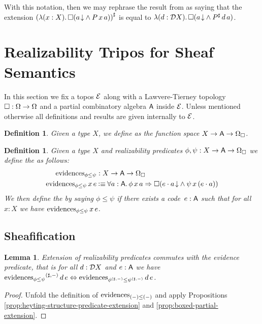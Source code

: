 \documentclass[11pt]{article}
\newtheorem{lemm}[thrm]{Lemma}
\newtheorem{defn}[thrm]{Definition}
\begin{document}
With this notation, then we may rephrase the result from
 as saying that the extension
%
\(
  {({\mathop{\lambda({x:X}).}{\Box{({{{a}\!\downarrow}}\land{P\,x\,a})}}})}^\sharp
\)
%
is equal to
%
\(
  {\mathop{\lambda({d:\mathcal{D}{X}}).}{\Box{({{{a}\!\downarrow}}\land{{P}^\sharp\,d\,a})}}}
\).


\newpage

\section{Realizability Tripos for Sheaf Semantics}

In this section we fix a topos \(\mathcal{E}\) along with a Lawvere-Tierney
topology \(\Box : \Omega \to \Omega\) and a partial combinatory
algebra \(\mathsf{A}\) inside \(\mathcal{E}\).
%
Unless mentioned otherwise all definitions and results are given
internally to \(\mathcal{E}\).

\begin{defn}\label{defn:tripos-predicates}
  Given a type \(X\), we define  as the function space \({{X}\to{{{\ensuremath{\mathsf{A}}}\to{\Omega_\Box}}}}\).
\end{defn}

\begin{defn}\label{defn:tripos-ordering}
  Given a type \(X\) and realizability predicates \(\phi,\psi : {{X}\to{{{\ensuremath{\mathsf{A}}}\to{\Omega_\Box}}}}\)
  we define the  as
  follows:
  \begin{align*}
    \IEvidence{\phi}{\psi}
    &: \IFun{X}{\IFun{\A}{\IPropCl}}
    \\
    {\IEvidence{\phi}{\psi}\,x\,e}
    &\IsDefined
      \IForall%
      {a:\A}%
      {\IImplies%
      {\phi\,x\,a}%
      {\IBox{(\IAnd{\ITotal{\IAp{e}{a}}}{\psi\,x\,(\IAp{e}{a})})}}}
  \end{align*}
  We then define the 
  by saying \(\phi\leq\psi\) if there exists a code~\(e : \mathsf{A}\)
  such that for all \(x : X\) we have \(\text{evidences}_{{\phi}\leq{\psi}}\,x\,e\).
\end{defn}

\subsection{Sheafification}

\begin{lemm}\label{prop:extension-of-evidence-predicate}
  Extension of realizability predicates commutes with the evidence
  predicate, that is for all \(d:\mathcal{D}{X}\) and \(e:\mathsf{A}\) we have
  \(
    {\text{evidences}_{{\phi}\leq{\psi}}}^{({\sharp,-})}\,d\,e
    \Leftrightarrow
    \text{evidences}_{{{\phi}^{({\sharp,-})}}\leq{{\psi}^{({\sharp,-})}}}\,d\,e
  \).
\end{lemm}
\begin{proof}
  Unfold the definition of \(\text{evidences}_{{(-)}\leq{(-)}}\) and apply Propositions
  \ref{prop:heyting-structure-predicate-extension} and
  \ref{prop:boxed-partial-extension}.
\end{proof}
\end{document}
